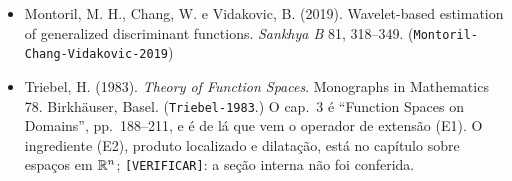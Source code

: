 \documentclass[11pt,a4paper]{article}
\begin{document}
\begin{itemize}[nosep]
    ``cap.~III, \S 11'' para a base periodizada; L3 não conseguiu conferir as
    seções internas dos capítulos (sem acesso ao volume) e trocou aquela
    citação por Daubechies (1992, \S 9.3), que foi conferida.
  \item Montoril, M. H., Chang, W. e Vidakovic, B. (2019). Wavelet-based
    estimation of generalized discriminant functions. \emph{Sankhya B} 81,
    318--349. (\texttt{Montoril-Chang-Vidakovic-2019})
  \item Triebel, H. (1983). \emph{Theory of Function Spaces}. Monographs in
    Mathematics 78. Birkhäuser, Basel. (\texttt{Triebel-1983}.) O cap.~3 é
    ``Function Spaces on Domains'', pp.~188--211, e é de lá que vem o
    operador de extensão (E1). O ingrediente (E2), produto localizado e
    dilatação, está no capítulo sobre espaços em $\mathbb{R}^{n}$;
    \texttt{[VERIFICAR]}: a seção interna não foi conferida.
\end{itemize}
\end{document}
